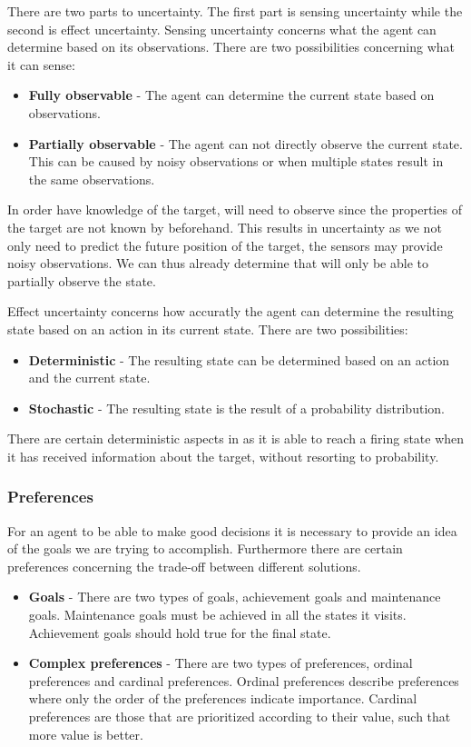 There are two parts to uncertainty. The first part is sensing uncertainty while
the second is effect uncertainty. Sensing uncertainty concerns what the agent
can determine based on its observations. There are two possibilities concerning
what it can sense:
\begin{itemize}
  \item \textbf{Fully observable} - The agent can determine the current state
  based on observations.
  \item \textbf{Partially observable} - The agent can not directly observe the
  current state. This can be caused by noisy observations or when multiple
  states result in the same observations.
\end{itemize}

In order have knowledge of the target, \name will need to observe since the
properties of the target are not known by \name beforehand. This results in
uncertainty as we not only need to predict the future position of the target,
the sensors may provide noisy observations. We can thus already determine that
\name will only be able to partially observe the state.\nl

Effect uncertainty concerns how accuratly the agent can determine the resulting
state based on an action in its current state. There are two possibilities:
\begin{itemize}
  \item \textbf{Deterministic} - The resulting state can be determined based on
  an action and the current state.
  \item \textbf{Stochastic} - The resulting state is the result of a probability
  distribution.
\end{itemize}

There are certain deterministic aspects in \name as it is able to reach a
firing state when it has received information about the target, without
resorting to probability.
 
\subsubsection{Preferences}
For an agent to be able to make good decisions it is necessary to provide an
idea of the goals we are trying to accomplish. Furthermore there are certain
preferences concerning the trade-off between different solutions.

\begin{itemize}
  \item \textbf{Goals} - There are two types of goals, achievement goals and
  maintenance goals. Maintenance goals must be achieved in all the states it
  visits. Achievement goals should hold true for the final state. 
  \item \textbf{Complex preferences} - There are two types of preferences,
  ordinal preferences and cardinal preferences. Ordinal preferences describe
  preferences where only the order of the preferences indicate importance.
  Cardinal preferences are those that are prioritized according to their value,
  such that more value is better.
\end{itemize}

